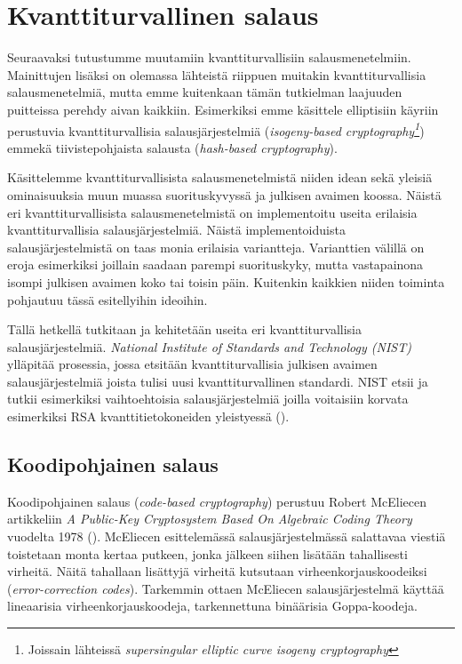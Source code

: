 \chapter{Kvanttiturvallinen salaus\label{results}}

Seuraavaksi tutustumme muutamiin kvanttiturvallisiin salausmenetelmiin. Mainittujen lisäksi on olemassa lähteistä riippuen muitakin kvanttiturvallisia salausmenetelmiä, mutta emme kuitenkaan tämän tutkielman laajuuden puitteissa perehdy aivan kaikkiin. Esimerkiksi emme käsittele elliptisiin käyriin perustuvia kvanttiturvallisia salausjärjestelmiä (\emph{isogeny-based cryptography\footnote{Joissain lähteissä \emph{supersingular elliptic curve isogeny cryptography}}}) emmekä tiivistepohjaista salausta (\emph{hash-based cryptography}).


Käsittelemme kvanttiturvallisista salausmenetelmistä niiden idean sekä yleisiä ominaisuuksia muun muassa suorituskyvyssä ja julkisen avaimen koossa. Näistä eri kvanttiturvallisista salausmenetelmistä on implementoitu useita erilaisia kvanttiturvallisia salausjärjestelmiä. Näistä implementoiduista salausjärjestelmistä on taas monia erilaisia variantteja. Varianttien välillä on eroja esimerkiksi joillain saadaan parempi suorituskyky, mutta vastapainona isompi julkisen avaimen koko tai toisin päin. Kuitenkin kaikkien niiden toiminta pohjautuu tässä esitellyihin ideoihin.

Tällä hetkellä tutkitaan ja kehitetään useita eri kvanttiturvallisia salausjärjestelmiä. \emph{National Institute of Standards and Technology (NIST)} ylläpitää prosessia, jossa etsitään kvanttiturvallisia julkisen avaimen salausjärjestelmiä joista tulisi uusi kvanttiturvallinen standardi. NIST etsii ja tutkii esimerkiksi vaihtoehtoisia salausjärjestelmiä joilla voitaisiin korvata esimerkiksi RSA kvanttitietokoneiden yleistyessä (\cite{alagic2020status}).

\section{Koodipohjainen salaus}
Koodipohjainen salaus (\emph{code-based cryptography}) perustuu Robert McEliecen artikkeliin \emph{A Public-Key Cryptosystem Based On Algebraic Coding Theory} vuodelta 1978 (\cite{8012331}). McEliecen esittelemässä salausjärjestelmässä salattavaa viestiä toistetaan monta kertaa putkeen, jonka jälkeen siihen lisätään tahallisesti virheitä. Näitä tahallaan lisättyjä virheitä kutsutaan virheenkorjauskoodeiksi (\emph{error-correction codes}). Tarkemmin ottaen McEliecen salausjärjestelmä käyttää lineaarisia virheenkorjauskoodeja, tarkennettuna binäärisia Goppa-koodeja.

